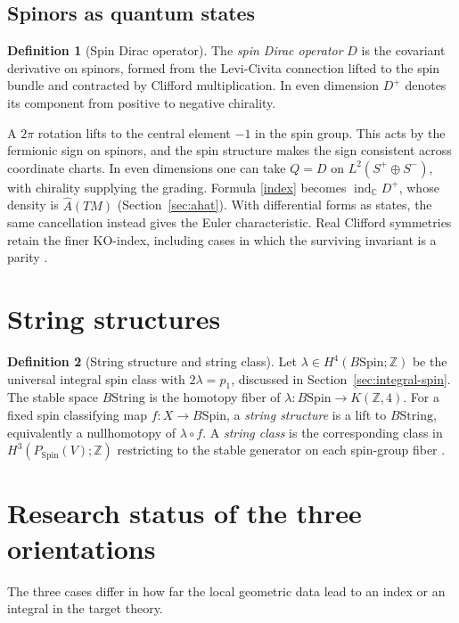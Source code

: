\documentclass[11pt]{article}
\theoremstyle{definition}
\newtheorem{defn}{Definition}[section]
\newcommand{\KO}{\mathrm{KO}}
\newcommand{\ind}{\operatorname{ind}}
\newcommand{\Z}{\mathbb Z}
\newcommand{\Ahat}{\widehat A}
\newcommand{\Spin}{\mathrm{Spin}}
\newcommand{\String}{\mathrm{String}}
\begin{document}
\subsection{Spinors as quantum states}
\begin{defn}[Spin Dirac operator]
The \emph{spin Dirac operator} \(D\) is the covariant derivative on spinors, formed from the Levi-Civita connection lifted to the spin bundle and contracted by Clifford multiplication. In even dimension \(D^+\) denotes its component from positive to negative chirality.
\end{defn}
A \(2\pi\) rotation lifts to the central element \(-1\) in the spin group. This acts by the fermionic sign on spinors, and the spin structure makes the sign consistent across coordinate charts. In even dimensions one can take \(Q=D\) on \(L^2(S^+\oplus S^-)\), with chirality supplying the grading. Formula \eqref{index} becomes \(\ind_{\mathbb C}D^+\), whose density is \(\Ahat(TM)\) (Section~\ref{sec:ahat}). With differential forms as states, the same cancellation instead gives the Euler characteristic. Real Clifford symmetries retain the finer \(\KO\)-index, including cases in which the surviving invariant is a parity \cite{TYK}.

\section{String structures}
\begin{defn}[String structure and string class]\label{def:string-structure}
Let \(\lambda\in H^4(B\Spin;\Z)\) be the universal integral spin class with \(2\lambda=p_1\), discussed in Section~\ref{sec:integral-spin}. The stable space \(B\String\) is the homotopy fiber of \(\lambda:B\Spin\to K(\Z,4)\). For a fixed spin classifying map \(f:X\to B\Spin\), a \emph{string structure} is a lift to \(B\String\), equivalently a nullhomotopy of \(\lambda\circ f\). A \emph{string class} is the corresponding class in \(H^3(P_{\Spin}(V);\Z)\) restricting to the stable generator on each spin-group fiber \cite{Redden}.
\end{defn}

\section{Research status of the three orientations}
The three cases differ in how far the local geometric data lead to an index or an integral in the target theory.
\end{document}
